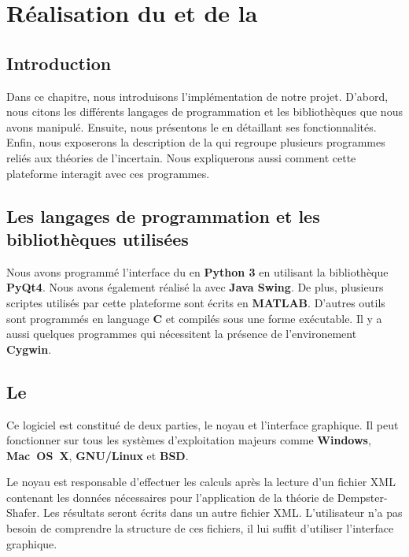 \chapter{Réalisation du \appname et de la \platformename}
{}
\section*{Introduction}

Dans ce chapitre, nous introduisons l'implémentation de notre projet. D'abord, nous
citons les différents langages de programmation et les bibliothèques que nous avons manipulé.
Ensuite, nous présentons le \appname en détaillant ses fonctionnalités. Enfin, nous exposerons
la description de la \platformename qui regroupe plusieurs programmes reliés aux théories de
l'incertain. Nous expliquerons aussi comment cette plateforme interagit avec ces programmes.

\section{Les langages de programmation et les bibliothèques utilisées}

Nous avons programmé l'interface du \appname en \textbf{Python 3}
en utilisant la bibliothèque \textbf{PyQt4}. Nous avons également réalisé la \platformename
avec \textbf{Java Swing}. De plus, plusieurs scriptes utilisés par cette
plateforme sont écrits en \textbf{MATLAB}. D'autres outils sont programmés en language
\textbf{C} et compilés sous une forme exécutable. Il y a aussi quelques programmes
qui nécessitent la présence de l'environement \textbf{Cygwin}.

\section{Le \appname}

Ce logiciel est constitué de deux parties, le noyau et l'interface graphique.
Il peut fonctionner sur tous les systèmes d'exploitation majeurs comme \textbf{Windows},
\textbf{\mbox{Mac OS X}}, \textbf{\mbox{GNU/Linux}} et \textbf{BSD}.

Le noyau est responsable d'effectuer les calculs après la lecture d'un fichier XML
contenant les données nécessaires pour l'application de la théorie de Dempster-Shafer.
Les résultats seront écrits dans un autre fichier XML. L'utilisateur n'a pas besoin
de comprendre la structure de ces fichiers, il lui suffit d'utiliser l'interface
graphique.

